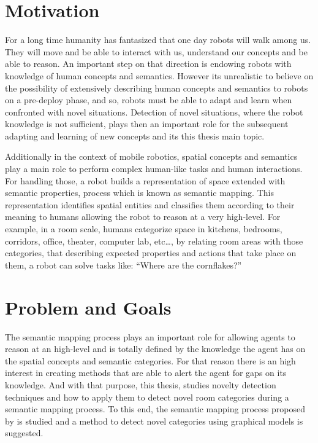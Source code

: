 \documentclass[9pt,a4paper]{extarticle}
\begin{document}
\begin{multicols}{2}

\section{Motivation}
For a long time humanity has fantasized that one day robots will walk among us.
They will move and be able to interact with us, understand our concepts and
be able to reason.
An important step on that direction is endowing robots with knowledge of human concepts and
semantics. However its unrealistic to believe on the possibility of extensively
describing human concepts and semantics to robots on a pre-deploy phase, and so, robots must be able
to adapt and learn when confronted with novel situations.
Detection of novel situations, where the robot knowledge is not sufficient, plays then an important
role for the subsequent adapting and learning of new concepts and its this thesis main topic.

Additionally in the context of mobile robotics, spatial concepts and semantics play a main role to perform
complex human-like tasks and human interactions. For handling those, a robot builds a representation
of space extended with semantic properties, process which is known as semantic mapping.
This representation identifies spatial entities and classifies them according to their meaning to
humans allowing the robot to reason at a very high-level.
For example, in a room scale, humans categorize space in kitchens, bedrooms, corridors,
office, theater, computer lab, etc\dots, by relating room areas with those categories, that describing expected
properties and actions that take place on them, a robot can solve tasks like:
``Where are the cornflakes?''

\section{Problem and Goals}
The semantic mapping process plays an important role for allowing agents to reason at an high-level
and is totally defined by the knowledge the agent has on the spatial concepts and semantic categories.
For that reason there is an high interest in creating methods that are able to alert the agent for
gaps on its knowledge.
And with that purpose, this thesis, studies novelty detection techniques and how to apply them to
detect novel room categories during a semantic mapping process.
To this end, the semantic mapping process proposed by \cite{pronobis2011phd} is studied and a method
to detect novel categories using graphical models is suggested.


\end{multicols}
\end{document}
